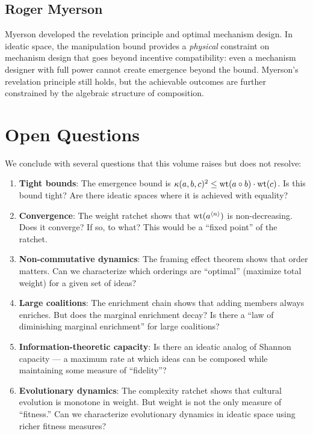 \subsection*{Roger Myerson}
Myerson developed the revelation principle and optimal mechanism design. In ideatic space, the manipulation bound provides a \emph{physical} constraint on mechanism design that goes beyond incentive compatibility: even a mechanism designer with full power cannot create emergence beyond the bound. Myerson's revelation principle still holds, but the achievable outcomes are further constrained by the algebraic structure of composition.

\section{Open Questions}

We conclude with several questions that this volume raises but does not resolve:

\begin{enumerate}
\item \textbf{Tight bounds}: The emergence bound is $\kappa(a,b,c)^2 \leq \operatorname{wt}(a \circ b) \cdot \operatorname{wt}(c)$. Is this bound tight? Are there ideatic spaces where it is achieved with equality?

\item \textbf{Convergence}: The weight ratchet shows that $\operatorname{wt}(a^{\langle n \rangle})$ is non-decreasing. Does it converge? If so, to what? This would be a ``fixed point'' of the ratchet.

\item \textbf{Non-commutative dynamics}: The framing effect theorem shows that order matters. Can we characterize which orderings are ``optimal'' (maximize total weight) for a given set of ideas?

\item \textbf{Large coalitions}: The enrichment chain shows that adding members always enriches. But does the marginal enrichment decay? Is there a ``law of diminishing marginal enrichment'' for large coalitions?

\item \textbf{Information-theoretic capacity}: Is there an ideatic analog of Shannon capacity --- a maximum rate at which ideas can be composed while maintaining some measure of ``fidelity''?

\item \textbf{Evolutionary dynamics}: The complexity ratchet shows that cultural evolution is monotone in weight. But weight is not the only measure of ``fitness.'' Can we characterize evolutionary dynamics in ideatic space using richer fitness measures?
\end{enumerate}

